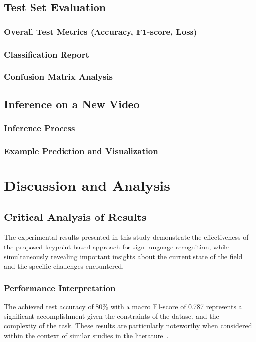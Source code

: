 \documentclass[11pt, a4paper]{article}
\begin{document}
    \subsection{Test Set Evaluation}
        \subsubsection{Overall Test Metrics (Accuracy, F1-score, Loss)}
        \subsubsection{Classification Report}
        \subsubsection{Confusion Matrix Analysis}
    \subsection{Inference on a New Video}
        \subsubsection{Inference Process}
        \subsubsection{Example Prediction and Visualization}

\section{Discussion and Analysis}

\subsection{Critical Analysis of Results}

The experimental results presented in this study demonstrate the effectiveness of the proposed keypoint-based approach for sign language recognition, while simultaneously revealing important insights about the current state of the field and the specific challenges encountered.

\subsubsection{Performance Interpretation}

The achieved test accuracy of 80\% with a macro F1-score of 0.787 represents a significant accomplishment given the constraints of the dataset and the complexity of the task. These results are particularly noteworthy when considered within the context of similar studies in the literature~\cite{Adaloglou21, Huang18}.
\end{document}
